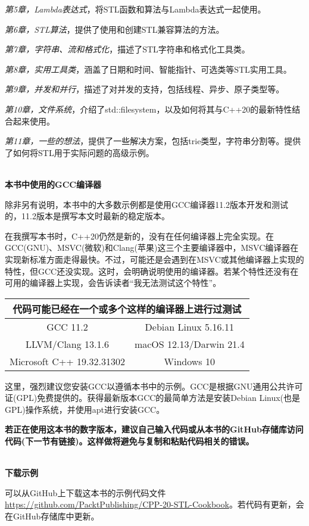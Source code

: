 \textit{第5章，Lambda表达式}，将STL函数和算法与Lambda表达式一起使用。

\textit{第6章，STL算法}，提供了使用和创建STL兼容算法的方法。

\textit{第7章，字符串、流和格式化}，描述了STL字符串和格式化工具类。

\textit{第8章，实用工具类}，涵盖了日期和时间、智能指针、可选类等STL实用工具。

\textit{第9章，并发和并行}，描述了对并发的支持，包括线程、异步、原子类型等。

\textit{第10章，文件系统}，介绍了std::filesystem，以及如何将其与C++20的最新特性结合起来使用。

\textit{第11章，一些的想法}，提供了一些解决方案，包括trie类型，字符串分割等。提供了如何将STL用于实际问题的高级示例。

\hspace*{\fill} \\ %
\noindent
\textbf{本书中使用的GCC编译器}

除非另有说明，本书中的大多数示例都是使用GCC编译器11.2版本开发和测试的，11.2版本是撰写本文时最新的稳定版本。

在我撰写本书时，C++20仍然是新的，没有在任何编译器上完全实现。在GCC(GNU)、MSVC(微软)和Clang(苹果)这三个主要编译器中，MSVC编译器在实现新标准方面走得最快。不过，可能还是会遇到在MSVC或其他编译器上实现的特性，但GCC还没实现。这时，会明确说明使用的编译器。若某个特性还没有在可用的编译器上实现，会告诉读者“我无法测试这个特性”。

\begin{table}[H]
\begin{tabular}{|cc|}
\hline
\multicolumn{2}{|c|}{代码可能已经在一个或多个这样的编译器上进行过测试} \\ \hline
\multicolumn{1}{|c|}{GCC 11.2}                  & Debian Linux 5.16.11    \\ \hline
\multicolumn{1}{|c|}{LLVM/Clang 13.1.6}         & macOS 12.13/Darwin 21.4 \\ \hline
\multicolumn{1}{|c|}{Microsoft C++ 19.32.31302} & Windows 10              \\ \hline
\end{tabular}
\end{table}

这里，强烈建议您安装GCC以遵循本书中的示例。GCC是根据GNU通用公共许可证(GPL)免费提供的。获得最新版本GCC的最简单方法是安装Debian Linux(也是GPL)操作系统，并使用apt进行安装GCC。

\textbf{若正在使用这本书的数字版本，建议自己输入代码或从本书的GitHub存储库访问代码(下一节有链接)。这样做将避免与复制和粘贴代码相关的错误。}

\hspace*{\fill} \\ %
\noindent
\textbf{下载示例}

可以从GitHub上下载这本书的示例代码文件\url{https://github.com/PacktPublishing/CPP-20-STL-Cookbook}。若代码有更新，会在GitHub存储库中更新。



















